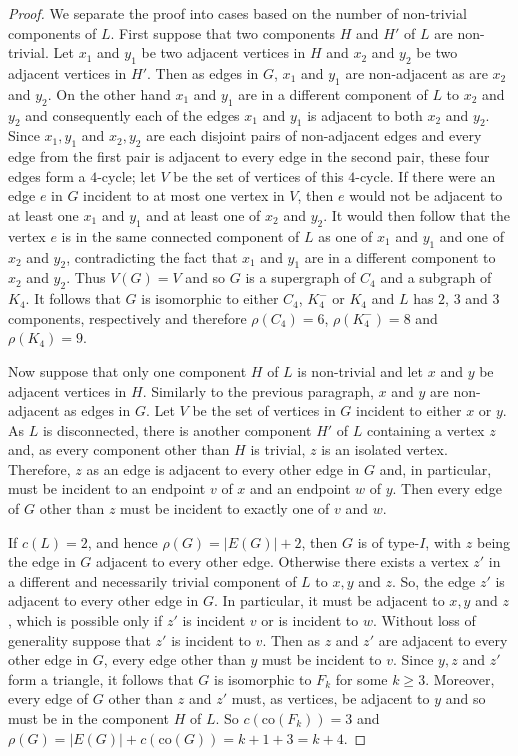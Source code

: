 \documentclass[12pt]{article}
\theoremstyle{definition}
\newcommand{\co}{\text{co}}
\begin{document}
\begin{proof} 
We separate the proof into cases based on the number of non-trivial components of $L$.
First suppose that two components $H$ and $H'$ of $L$ are non-trivial. 
Let $x_1$ and $y_1$ be two adjacent vertices in $H$ and 
$x_2$ and $y_2$ be two adjacent vertices in $H'$.
Then as edges in $G$, $x_1$ and $y_1$ are non-adjacent as are $x_2$ and $y_2$.
On the other hand $x_1$ and $y_1$ are in a different component of $L$ to $x_2$ and $y_2$ and consequently each of the edges $x_1$ and $y_1$ is adjacent to both $x_2$ and $y_2$.
Since $x_1,y_1$ and $x_2,y_2$ are each disjoint pairs of 
non-adjacent edges and every edge from the first pair is adjacent to every edge in the second pair, these four edges form a $4$-cycle; 
let $V$ be the set of vertices of this $4$-cycle. 
If there were an edge $e$ in $G$ incident to at most one vertex in $V$, then $e$ would not be adjacent to at least one $x_1$ and $y_1$ and at least one of $x_2$ and $y_2$. 
It would then follow that the vertex $e$ is in the same connected component of $L$ as one of  $x_1$ and $y_1$ and one of  $x_2$ and $y_2$, contradicting the fact that  $x_1$ and $y_1$ are in a different component to $x_2$ and $y_2$.
Thus $V(G)=V$ and so $G$ is a supergraph of $C_4$ and a subgraph of $K_4$. It follows that $G$ is isomorphic to either $C_4$, $K_4^-$ or $K_4$ and $L$ has $2$, $3$ and $3$ components, respectively and therefore $\rho(C_4)=6$, $\rho(K_4^-)=8$ and $\rho(K_4)=9$.

Now suppose that only one component $H$ of $L$ is non-trivial and let $x$ and $y$ be adjacent vertices in $H$. 
Similarly to the previous paragraph, $x$ and $y$ are non-adjacent as edges in $G$.
Let $V$ be the set of vertices in $G$ incident to either $x$ or $y$.
As $L$ is disconnected, there is another component $H'$ of $L$ containing a vertex $z$ and, as every component other than $H$ is trivial, $z$ is an isolated vertex. 
Therefore, $z$ as an edge is adjacent to every other edge in $G$ and, in particular, must be incident to an endpoint $v$ of $x$ and an endpoint $w$ of $y$. 
Then every edge of $G$ other than $z$ must be incident to exactly one of $v$ and $w$. 

If $c(L)=2$, and hence $\rho(G)=|E(G)|+2$, then $G$ is of type-$I$, with $z$ being the edge in $G$ adjacent to every other edge. 
Otherwise there exists a vertex $z'$ in a different and necessarily trivial component of $L$ to $x,y$ and $z$. 
So, the edge  $z'$ is adjacent to every other edge in $G$. 
In particular, it must be adjacent to $x,y$ and $z$, which is possible only if $z'$ is incident $v$ or is incident to $w$. 
Without loss of generality suppose that $z'$ is incident to $v$. 
Then as $z$ and $z'$ are adjacent to every other edge in $G$, every edge other than $y$ must be incident to $v$. 
Since $y,z$ and $z'$ form a triangle, it follows that $G$ is isomorphic to $F_k$ for some $k \geq 3$.
Moreover, every edge of $G$ other than $z$ and $z'$ must, as vertices, be adjacent to $y$ and so must be in the component $H$ of $L$. 
So $c(\co(F_k))=3$ and $\rho(G)= |E(G)|+c(\co(G))= k+1+3=k+4$.


\end{proof}
\end{document}
